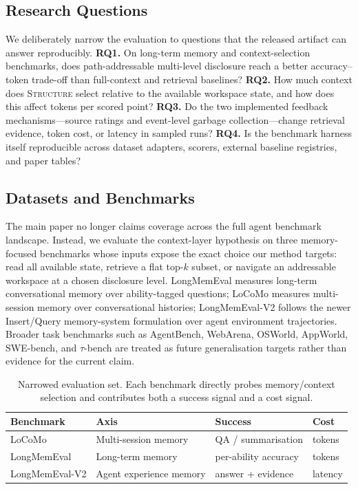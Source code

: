 \subsection{Research Questions}

We deliberately narrow the evaluation to questions that the released
artifact can answer reproducibly.
\textbf{RQ1.} On long-term memory and context-selection benchmarks,
does path-addressable multi-level disclosure reach a better
accuracy--token trade-off than full-context and retrieval baselines?
\textbf{RQ2.} How much context does \textsc{Structure} select relative
to the available workspace state, and how does this affect tokens per
scored point?
\textbf{RQ3.} Do the two implemented feedback mechanisms---source
ratings and event-level garbage collection---change retrieval
evidence, token cost, or latency in sampled runs?
\textbf{RQ4.} Is the benchmark harness itself reproducible across
dataset adapters, scorers, external baseline registries, and paper
tables?

\subsection{Datasets and Benchmarks}

The main paper no longer claims coverage across the full agent
benchmark landscape. Instead, we evaluate the context-layer hypothesis
on three memory-focused benchmarks whose inputs expose the exact
choice our method targets: read all available state, retrieve a flat
top-$k$ subset, or navigate an addressable workspace at a chosen
disclosure level. LongMemEval measures long-term conversational memory
over ability-tagged questions; LoCoMo measures multi-session memory
over conversational histories; LongMemEval-V2 follows the newer
Insert/Query memory-system formulation over agent environment
trajectories. Broader task benchmarks such as AgentBench, WebArena,
OSWorld, AppWorld, SWE-bench, and $\tau$-bench are treated as future
generalisation targets rather than evidence for the current claim.

\begin{table}[t]
    \centering
    \small
    \begin{tabular}{p{}p{}p{}p{}}
        \toprule
        Benchmark & Axis & Success & Cost \\
        \midrule
        LoCoMo \citep{maharana2024locomo} & Multi-session memory & QA / summarisation & tokens \\
        LongMemEval \citep{wu2025longmemeval} & Long-term memory & per-ability accuracy & tokens \\
        LongMemEval-V2 \citep{wu2026longmemevalv2} & Agent experience memory & answer + evidence & latency \\
        \bottomrule
    \end{tabular}
    \caption{Narrowed evaluation set. Each benchmark directly probes
    memory/context selection and contributes both a success signal and
    a cost signal.}
    \label{tab:datasets}
\end{table}

